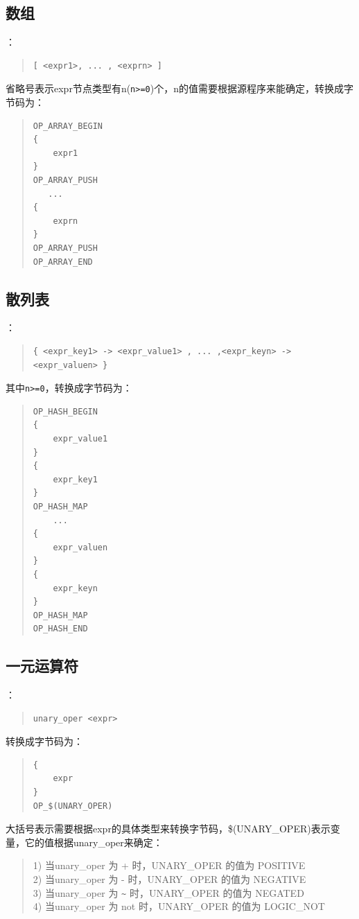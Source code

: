 \subsection{数组}
：
\begin{quote}
\begin{verbatim}
[ <expr1>, ... , <exprn> ]
\end{verbatim}
\end{quote}
省略号表示expr节点类型有n(\verb|n>=0|)个，n的值需要根据源程序来能确定，转换成字节码为：
\begin{quote}
\begin{verbatim}
OP_ARRAY_BEGIN
{
    expr1
}
OP_ARRAY_PUSH
   ...
{
    exprn
}
OP_ARRAY_PUSH
OP_ARRAY_END
\end{verbatim}
\end{quote}

\subsection{散列表}
：
\begin{quote}
\begin{verbatim}
{ <expr_key1> -> <expr_value1> , ... ,<expr_keyn> -> <expr_valuen> } 
\end{verbatim}
\end{quote}
其中\verb|n>=0|，转换成字节码为：
\begin{quote}
\begin{verbatim}
OP_HASH_BEGIN
{
    expr_value1
}
{
    expr_key1
}
OP_HASH_MAP
    ...
{
    expr_valuen
}
{
    expr_keyn
}
OP_HASH_MAP
OP_HASH_END
\end{verbatim}
\end{quote}




\subsection{一元运算符}
：
\begin{quote}
\begin{verbatim}
unary_oper <expr>
\end{verbatim}
\end{quote}
转换成字节码为：
\begin{quote}
\begin{verbatim}
{
    expr
}
OP_$(UNARY_OPER)
\end{verbatim}
\end{quote}
大括号表示需要根据expr的具体类型来转换字节码，\$(UNARY\_OPER)表示变量，它的值根据unary\_oper来确定：
\begin{quote}
1) 当unary\_oper 为 + 时，UNARY\_OPER 的值为 POSITIVE \\
2) 当unary\_oper 为 - 时，UNARY\_OPER 的值为 NEGATIVE \\
3) 当unary\_oper 为 \verb|~| 时，UNARY\_OPER 的值为 NEGATED \\
4) 当unary\_oper 为 not 时，UNARY\_OPER 的值为 LOGIC\_NOT
\end{quote}

